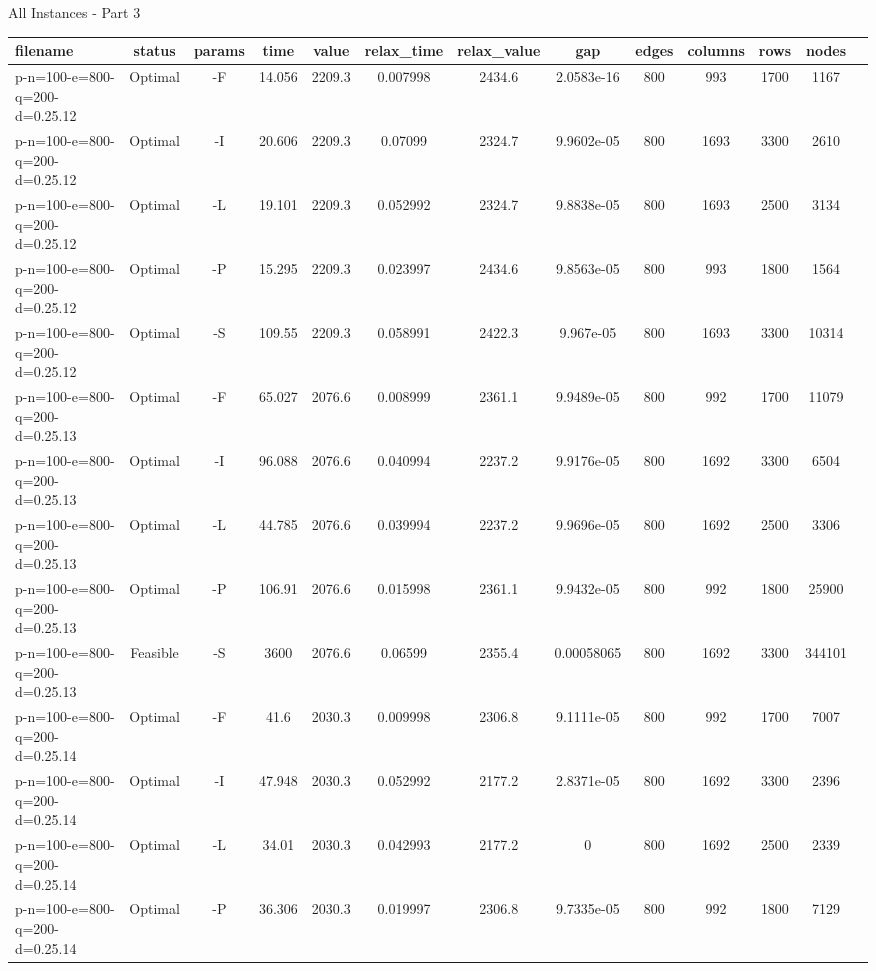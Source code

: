 \documentclass[landscape, a4paper]{article}
\begin{document}
\begin{center}
All Instances - Part 3

\begin{tabular}{lcccccccccccc}
filename & status & params & time & value & relax\_time & relax\_value & gap & edges & columns & rows & nodes & \\
\hline
p-n=100-e=800-q=200-d=0.25.12 & Optimal & -F & 14.056 & 2209.3 & 0.007998 & 2434.6 & 2.0583e-16 & 800 & 993 & 1700 & 1167 & \\
p-n=100-e=800-q=200-d=0.25.12 & Optimal & -I & 20.606 & 2209.3 & 0.07099 & 2324.7 & 9.9602e-05 & 800 & 1693 & 3300 & 2610 & \\
p-n=100-e=800-q=200-d=0.25.12 & Optimal & -L & 19.101 & 2209.3 & 0.052992 & 2324.7 & 9.8838e-05 & 800 & 1693 & 2500 & 3134 & \\
p-n=100-e=800-q=200-d=0.25.12 & Optimal & -P & 15.295 & 2209.3 & 0.023997 & 2434.6 & 9.8563e-05 & 800 & 993 & 1800 & 1564 & \\
p-n=100-e=800-q=200-d=0.25.12 & Optimal & -S & 109.55 & 2209.3 & 0.058991 & 2422.3 & 9.967e-05 & 800 & 1693 & 3300 & 10314 & \\
p-n=100-e=800-q=200-d=0.25.13 & Optimal & -F & 65.027 & 2076.6 & 0.008999 & 2361.1 & 9.9489e-05 & 800 & 992 & 1700 & 11079 & \\
p-n=100-e=800-q=200-d=0.25.13 & Optimal & -I & 96.088 & 2076.6 & 0.040994 & 2237.2 & 9.9176e-05 & 800 & 1692 & 3300 & 6504 & \\
p-n=100-e=800-q=200-d=0.25.13 & Optimal & -L & 44.785 & 2076.6 & 0.039994 & 2237.2 & 9.9696e-05 & 800 & 1692 & 2500 & 3306 & \\
p-n=100-e=800-q=200-d=0.25.13 & Optimal & -P & 106.91 & 2076.6 & 0.015998 & 2361.1 & 9.9432e-05 & 800 & 992 & 1800 & 25900 & \\
p-n=100-e=800-q=200-d=0.25.13 & Feasible & -S & 3600 & 2076.6 & 0.06599 & 2355.4 & 0.00058065 & 800 & 1692 & 3300 & 344101 & \\
p-n=100-e=800-q=200-d=0.25.14 & Optimal & -F & 41.6 & 2030.3 & 0.009998 & 2306.8 & 9.1111e-05 & 800 & 992 & 1700 & 7007 & \\
p-n=100-e=800-q=200-d=0.25.14 & Optimal & -I & 47.948 & 2030.3 & 0.052992 & 2177.2 & 2.8371e-05 & 800 & 1692 & 3300 & 2396 & \\
p-n=100-e=800-q=200-d=0.25.14 & Optimal & -L & 34.01 & 2030.3 & 0.042993 & 2177.2 & 0 & 800 & 1692 & 2500 & 2339 & \\
p-n=100-e=800-q=200-d=0.25.14 & Optimal & -P & 36.306 & 2030.3 & 0.019997 & 2306.8 & 9.7335e-05 & 800 & 992 & 1800 & 7129 & \\

\end{tabular}
\end{center}
\end{document}
